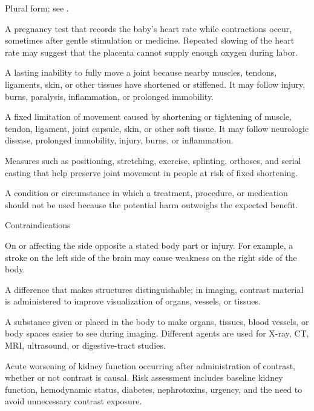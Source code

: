  Plural form; see .

 A pregnancy test that records the baby's heart rate while contractions occur, sometimes after gentle stimulation or medicine. Repeated slowing of the heart rate may suggest that the placenta cannot supply enough oxygen during labor.

 A lasting inability to fully move a joint because nearby muscles, tendons, ligaments, skin, or other tissues have shortened or stiffened. It may follow injury, burns, paralysis, inflammation, or prolonged immobility.

 A fixed limitation of movement caused by shortening or tightening of muscle, tendon, ligament, joint capsule, skin, or other soft tissue. It may follow neurologic disease, prolonged immobility, injury, burns, or inflammation.

 Measures such as positioning, stretching, exercise, splinting, orthoses, and serial casting that help preserve joint movement in people at risk of fixed shortening.

 A condition or circumstance in which a treatment, procedure, or medication should not be used because the potential harm outweighs the expected benefit.

\synonyms
Contraindications

 On or affecting the side opposite a stated body part or injury. For example, a stroke on the left side of the brain may cause weakness on the right side of the body.

 A difference that makes structures distinguishable; in imaging, contrast material is administered to improve visualization of organs, vessels, or tissues.

 A substance given or placed in the body to make organs, tissues, blood vessels, or body spaces easier to see during imaging. Different agents are used for X-ray, CT, MRI, ultrasound, or digestive-tract studies.

 Acute worsening of kidney function occurring after administration of contrast, whether
or not contrast is causal. Risk assessment includes baseline kidney function,
hemodynamic status, diabetes, nephrotoxins, urgency, and the need to avoid unnecessary
contrast exposure.


